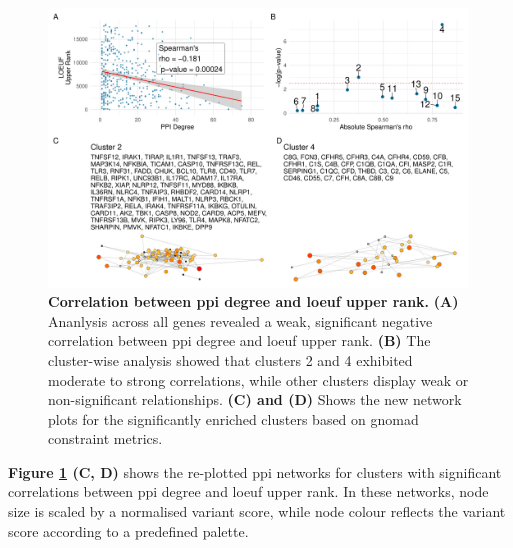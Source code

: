 \begin{figure}[ht]
  \centering
  \includegraphics[width=0.99\textwidth]{../images/untangleR_ppi_network_p_cor_spear_rho_sig_clust_patch3.pdf}
  \caption{
    \textbf{Correlation between \ac{ppi} degree and \ac{loeuf} upper rank.} 
    \textbf{(A)} Ananlysis across all genes revealed a weak, significant negative correlation between \ac{ppi} degree and \ac{loeuf} upper rank. \textbf{(B)} The cluster-wise analysis showed that clusters 2 and 4 exhibited moderate to strong correlations, while other clusters display weak or non-significant relationships. \textbf{(C) and (D)} Shows the new network plots for the significantly enriched clusters based on \ac{gnomad} constraint metrics.
  }
  \label{fig:p_cor_spear_rho_sig_clust_patch3}
\end{figure}

\textbf{Figure \ref{fig:p_cor_spear_rho_sig_clust_patch3} (C, D)} shows the re-plotted \ac{ppi} networks for clusters with significant correlations between \ac{ppi} degree and \ac{loeuf} upper rank. In these networks, node size is scaled by a normalised variant score, while node colour reflects the variant score according to a predefined palette.

